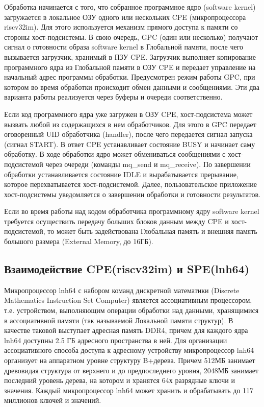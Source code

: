 Обработка начинается с того, что собранное программное ядро (software kernel) загружается в локальное ОЗУ одного или нескольких CPE (микропроцессора riscv32im). Для этого используется механизм прямого доступа к памяти со стороны хост-подсистемы. В свою очередь, GPC (один или несколько) получают сигнал о готовности образа software kernel в Глобальной памяти, после чего вызывается загрузчик, хранимый в ПЗУ CPE. Загрузчик выполняет копирование программного ядра из Глобальной памяти в ОЗУ CPE и передает управление на начальный адрес программы обработки. Предусмотрен режим работы GPC, при котором во время обработки происходит обмен данными и сообщениями. Эти два варианта работы реализуется через буферы и очереди соответственно.
\par Если код программного ядра уже загружен в ОЗУ CPE, хост-подсистема может вызвать любой из содержащихся в нем обработчиков. Для этого в GPC передает оговоренный UID обработчика (handler), после чего передается сигнал запуска (сигнал START). В ответ CPE устанавливает состояние BUSY и начинает саму обработку. В ходе обработки ядро может обмениваться сообщениями с хост-подсистемой через очереди (команды mq\_send и mq\_receive). По завершении обработки устанавливается состояние IDLE и вырабатывается прерывание, которое перехватывается хост-подсистемой. Далее, пользовательское приложение хост-подсистемы уведомляется о завершении обработки и готовности результатов.

Если во время работы над кодом обработчика программному ядру software kernel требуется осуществить передачу больших блоков данным между CPE и хост-подсистемой, то может быть задействована Глобальная память и внешняя память большого размера (External Memory, до 16ГБ).

\subsection{Взаимодействие CPE(riscv32im) и SPE(lnh64)}
Микропроцессор lnh64 с набором команд дискретной математики (Discrete Mathematics Instruction Set Computer) является ассоциативным процессором, т.е. устройством, выполняющим операции обработки над данными, хранящимися в ассоциативной памяти (так называемой Локальной памяти структур). В качестве таковой выступает адресная память DDR4, причем для каждого ядра lnh64 доступны 2.5 ГБ адресного пространства в ней. Для организации ассоциативного способа доступа к адресному устройству микропроцессор lnh64 организует на аппаратном уровне структуру B+дерева. Причем 512МБ занимает древовидая структура от верхнего и до предпоследнего уровня, 2048МБ занимает последний уровень дерева, на котором и хранятся 64х разрядные ключи и значения. Каждый микропроцессор lnh64 может хранить и обрабатывать до 117 миллионов ключей и значений.

